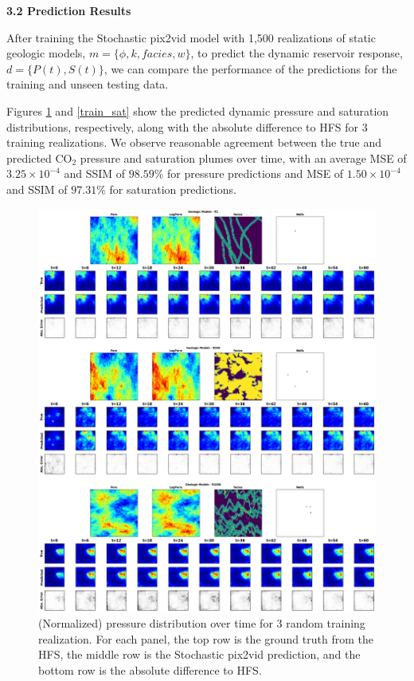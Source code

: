 \documentclass[10pt, twoside]{article}
\begin{document}
\textbf{3.2 Prediction Results}

After training the Stochastic pix2vid model with 1,500 realizations of static geologic models, $m=\{\phi,k,facies,w\}$, to predict the dynamic reservoir response, $d=\{P(t),S(t)\}$, we can compare the performance of the predictions for the training and unseen testing data. 

Figures \ref{train_pres} and \ref{train_sat} show the predicted dynamic pressure and saturation distributions, respectively, along with the absolute difference to HFS for 3 training realizations. We observe reasonable agreement between the true and predicted CO$_2$ pressure and saturation plumes over time, with an average MSE of $3.25\times10^{-4}$ and SSIM of $98.59\%$ for pressure predictions and MSE of $1.50\times10^{-4}$ and SSIM of $97.31\%$ for saturation predictions.

\begin{figure}
    \centering
    \includegraphics[width=16cm]{figures/train_pres.png}
    \caption{(Normalized) pressure distribution over time for 3 random training realization. For each panel, the top row is the ground truth from the HFS, the middle row is the Stochastic pix2vid prediction, and the bottom row is the absolute difference to HFS.}
    \label{train_pres}
\end{figure}
\end{document}
